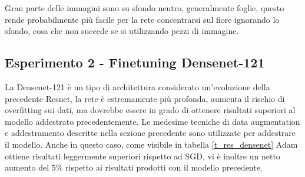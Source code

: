 Gran parte delle immagini sono su sfondo neutro, generalmente foglie, questo rende probabilmente più facile per la rete concentrarsi sul fiore ignorando lo sfondo, cosa che non succede se si utilizzando pezzi di immagine.
\subsection{Esperimento 2 - Finetuning Densenet-121}
La Densenet-121 \cite{huang2016densely} è un tipo di architettura considerato un'evoluzione della precedente Resnet, la rete è estremamente più profonda, aumenta il rischio di overfitting sui dati, ma dovrebbe essere in grado di ottenere risultati superiori al modello addestrato precedentemente. Le medesime tecniche di data augmentation e addestramento descritte nella sezione precedente sono utilizzate per addestrare il modello.
Anche in questo caso, come visibile in tabella \ref{t_res_densenet} Adam ottiene risultati leggermente superiori rispetto ad SGD, vi è inoltre un netto aumento del 5\% rispetto ai risultati prodotti con il modello precedente.
